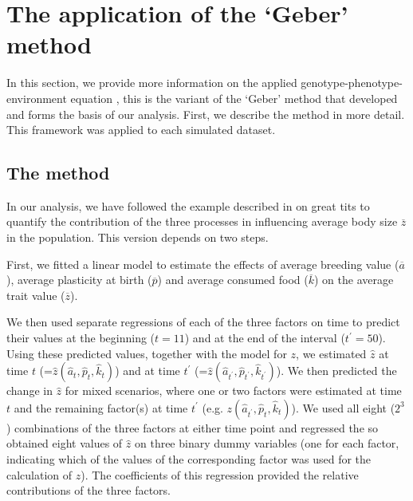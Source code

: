\graphicspath{{./Appendices/}}

\section{The application of the `Geber' method}
\label{app:gpe2}
In this section, we provide more information on the applied genotype-phenotype-environment equation \citep{Ellner2011,Hairston2005}, this is the variant of the `Geber' method that \citet{Ellner2011} developed and forms the basis of our analysis. First, we describe the method in more detail. This framework was applied to each simulated dataset.

\subsection{The method} \label{app:gpe2:eq}
In our analysis, we have followed the example described in \citet{Ellner2011} on great tits to quantify the contribution of the three processes in influencing average body size $\overline z$ in the population. This version depends on two steps. 

First, we fitted a linear model to estimate the effects of average breeding value ($\overline a$), average plasticity at birth ($\overline p$) and average consumed food ($\overline k$) on the average trait value ($\overline z$). 

We then used separate regressions of each of the three factors on time to predict their values at the beginning ($t=11$) and at the end of the interval ($t^\prime=50$). Using these predicted values, together with the model for $z$, we estimated $\hat z$ at time $t$ (=$\hat z(\hat{a}_t,\hat{p}_t,\hat{k}_t)$) and at time $t^\prime$ (=$\hat{z}(\hat{a}_{t^\prime},\hat{p}_{t^\prime},\hat{k}_{t^\prime})$). We then predicted the change in $\hat{z}$ for mixed scenarios, where one or two factors were estimated at time $t$ and the remaining factor(s) at time $t^\prime$ (e.g. $z(\hat{a}_{t^\prime},\hat{p}_{t},\hat{k}_{t})$). We used all eight ($2^3$) combinations of the three factors at either time point and regressed the so obtained eight values of $\hat z$ on three binary dummy variables (one for each factor, indicating which of the values of the corresponding factor was used for the calculation of $z$). The coefficients of this regression provided the relative contributions of the three factors.

